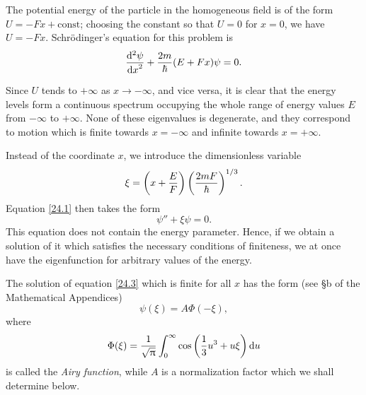 The potential energy of the particle in the homogeneous field is of the form $ U = −Fx+\mathrm{const} $; choosing the constant so that $ U = 0 $ for $ x = 0 $, we have $ U = -Fx $. Schr\"odinger's equation for this problem is
\begin{equation}\label{24.1}
\frac{\mathrm{d}^2\psi}{{\mathrm{d} x}^2}+\frac{2m}{\hbar}(E+Fx)\psi=0.
\end{equation}


Since $ U $ tends to $ + \infty $ as $ x \to- \infty $, and vice versa, it is clear that the energy levels form a continuous spectrum occupying the whole range of energy values $ E $ from $ -\infty $ to $ +\infty $. None of these eigenvalues is degenerate, and they correspond to motion which is finite towards $ x = -\infty $ and infinite towards $ x= +\infty $.

Instead of the coordinate $ x $, we introduce the dimensionless variable
\begin{equation}\label{24.2}
\xi=\left(x+\frac{E}{F} \right)\left(\frac{2mF}{\hbar}\right)^{1/3}.
\end{equation}
Equation \eqref{24.1} then takes the form
\begin{equation}\label{24.3}
\psi''+\xi\psi=0.
\end{equation}
This equation does not contain the energy parameter. Hence, if we obtain a solution of it which satisfies the necessary conditions of finiteness, we at once have the eigenfunction for arbitrary values of the energy.

The solution of equation \eqref{24.3} which is finite for all $ x $ has the form (see \S b of the Mathematical Appendices)
\begin{equation}\label{24.4}
\psi(\xi)=A\Phi(-\xi),
\end{equation}
where
\[ \Phi(\xi)=\frac{1}{\sqrt{\uppi}}\int_{0}^{\infty}\cos\left(\frac{1}{3}u^3+u\xi\right)\mathrm{d} u \]
is called the \textit{Airy function}, while $ A $ is a normalization factor which we shall determine below.

